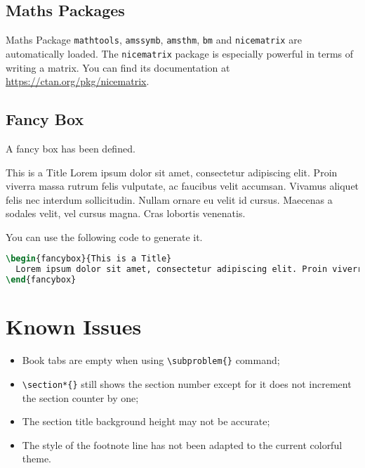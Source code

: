 \documentclass[twoside]{seu-ml-assign}
\renewcommand{\sectionheadname}{Section}
\begin{document}
    \subsection{Maths Packages} Maths Package \texttt{mathtools}, \texttt{amssymb}, \texttt{amsthm}, \texttt{bm} and \texttt{nicematrix} are automatically loaded.
    The \texttt{nicematrix} package is especially powerful in terms of writing a matrix.
    You can find its documentation at \url{https://ctan.org/pkg/nicematrix}.

    \subsection{Fancy Box} A fancy box has been defined.
      \begin{fancybox}{This is a Title}
        Lorem ipsum dolor sit amet, consectetur adipiscing elit. Proin viverra massa rutrum felis vulputate, ac faucibus velit accumsan. Vivamus aliquet felis nec interdum sollicitudin. Nullam ornare eu velit id cursus. Maecenas a sodales velit, vel cursus magna. Cras lobortis venenatis.
      \end{fancybox}


    You can use the following code to generate it.
    \begin{lstlisting}[language=tex,numbers=none,morekeywords={begin}]
\begin{fancybox}{This is a Title}
  Lorem ipsum dolor sit amet, consectetur adipiscing elit. Proin viverra massa rutrum felis vulputate, ac faucibus velit accumsan. Vivamus aliquet felis nec interdum sollicitudin. Nullam ornare eu velit id cursus. Maecenas a sodales velit, vel cursus magna. Cras lobortis venenatis.
\end{fancybox}
    \end{lstlisting}

  \appendix
  \renewcommand{\sectionheadname}{Appendix}

  \section{Known Issues}\label{sec:known_issues}

    \begin{itemize}
      \item Book tabs are empty when using \verb|\subproblem{}| command;
      \item \verb|\section*{}| still shows the section number except for it does not increment the section counter by one;
      \item The section title background height may not be accurate;
      \item The style of the footnote line has not been adapted to the current colorful theme.
    \end{itemize}
\end{document}
